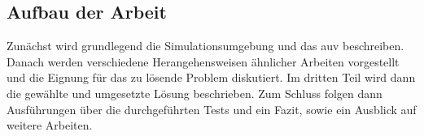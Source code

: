 \subsection{Aufbau der Arbeit}
Zunächst wird grundlegend die Simulationsumgebung und das \gls{auv} beschreiben. Danach werden verschiedene Herangehensweisen ähnlicher Arbeiten vorgestellt und die Eignung für das zu lösende Problem diskutiert.
Im dritten Teil wird dann die gewählte und umgesetzte Lösung beschrieben. Zum Schluss folgen dann Ausführungen über die durchgeführten Tests und ein Fazit, sowie ein Ausblick auf weitere Arbeiten.